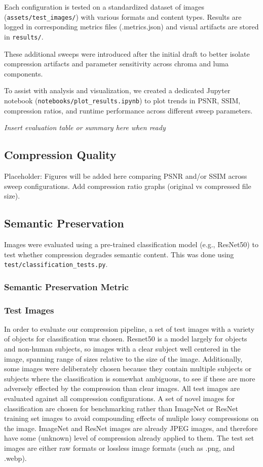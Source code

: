 Each configuration is tested on a standardized dataset of images (\texttt{assets/test\_images/}) with various formats and content types. Results are logged in corresponding metrics files (.metrics.json) and visual artifacts are stored in \texttt{results/}.

These additional sweeps were introduced after the initial draft to better isolate compression artifacts and parameter sensitivity across chroma and luma components.

To assist with analysis and visualization, we created a dedicated Jupyter notebook (\texttt{notebooks/plot\_results.ipynb}) to plot trends in PSNR, SSIM, compression ratios, and runtime performance across different sweep parameters.

\textit{Insert evaluation table or summary here when ready}

\subsection{Compression Quality}
Placeholder: Figures will be added here comparing PSNR and/or SSIM across sweep configurations. Add compression ratio graphs (original vs compressed file size).

\subsection{Semantic Preservation}
Images were evaluated using a pre-trained classification model (e.g., ResNet50) to test whether compression degrades semantic content. This was done using \texttt{test/classification\_tests.py}.

\subsubsection{Semantic Preservation Metric}


\subsubsection{Test Images}

In order to evaluate our compression pipeline, a set of test images with a variety of objects for classification was chosen. Resnet50 is a model largely for objects and non-human subjects, so images with a clear subject well centered in the image, spanning range of sizes relative to the size of the image. Additionally, some images were deliberately chosen because they contain multiple subjects or subjects where the classification is somewhat ambiguous, to see if these are more adversely effected by the compression than clear images. All test images are evaluated against all compression configurations. A set of novel images for classification are chosen for benchmarking rather than ImageNet or ResNet training set images to avoid compounding effects of muliple lossy compressions on the image. ImageNet and ResNet images are already JPEG images, and therefore have some (unknown) level of compression already applied to them. The test set images are either raw formats or lossless image formats (such as .png, and .webp).

